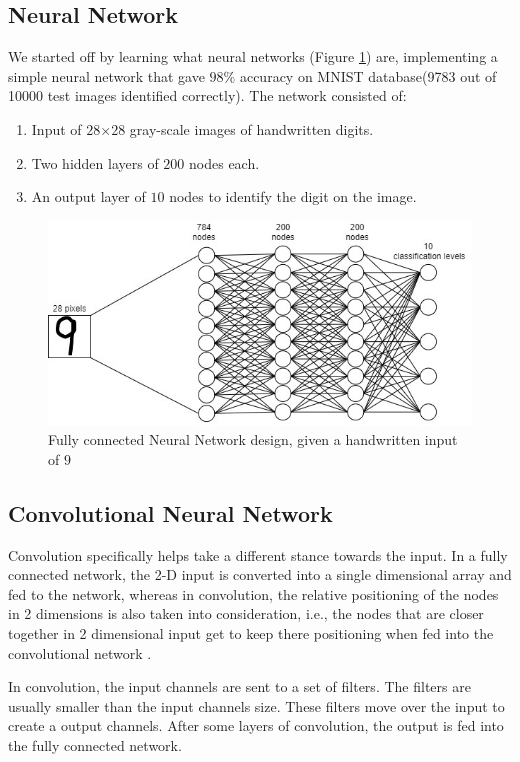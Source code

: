 \documentclass[12pt]{acmart}
\begin{document}
\subsection{Neural Network}
We started off by learning what neural networks (Figure \ref{fig:NN}) are\cite{backpropagation}\cite{NN}\cite{3b1b}, implementing a simple neural network that gave $98\%$ accuracy on MNIST database\cite{MNIST}(9783 out of 10000 test images identified correctly).
The network consisted of:
\begin{enumerate}
    \item Input of $28$$\times$$28$ gray-scale images of handwritten digits.
    \item Two hidden layers of $200$ nodes each.
    \item An output layer of $10$ nodes to identify the digit on the image.
\end{enumerate}
\begin{figure}[H]
  \includegraphics[width=\linewidth]{NN.jpg}
  \caption{Fully connected Neural Network design, given a handwritten input of $9$}
  \label{fig:NN}
\end{figure}


\subsection{Convolutional Neural Network}
Convolution specifically helps take a different stance towards the input. In a fully connected network, the 2-D input is converted into a single dimensional array and fed to the network, whereas in convolution, the relative positioning of the nodes in 2 dimensions is also taken into consideration, i.e., the nodes that are closer together in 2 dimensional input get to keep there positioning when fed into the convolutional network \cite{CNN}.

In convolution, the input channels are sent to a set of filters. The filters are usually smaller than the input channels size. These filters move over the input to create a output channels. After some layers of convolution, the output is fed into the fully connected network.
\end{document}
